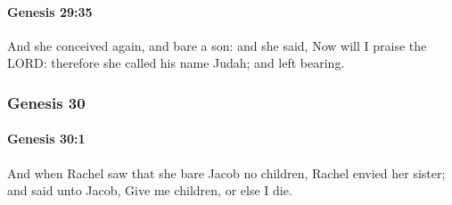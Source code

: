 		\paragraph{Genesis 29:35} %
			\label{GENESIS-29-35}

			And she conceived again, and bare a son: and she said, Now will I praise the LORD: therefore she called his name Judah; and left bearing.

	\subsubsection{Genesis 30} %
		\label{GENESIS-30}

		\paragraph{Genesis 30:1} %
			\label{GENESIS-30-1}

			And when Rachel saw that she bare Jacob no children, Rachel envied her sister; and said unto Jacob, Give me children, or else I die.

